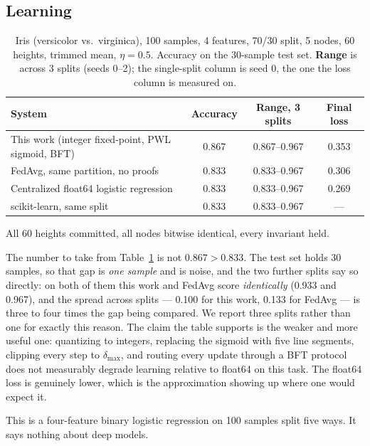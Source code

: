 \documentclass{llncs}
\begin{document}
\subsection{Learning}
\label{sec:eval-learning}

\begin{table}[t]
\centering
\caption{Iris (versicolor vs.\ virginica), 100 samples, 4 features, 70/30 split,
5 nodes, 60 heights, trimmed mean, $\eta = 0.5$. Accuracy on the 30-sample test
set. \textbf{Range} is across 3 splits (seeds 0--2); the single-split column is
seed 0, the one the loss column is measured on.}
\label{tab:learning}
\begin{tabular}{lccc}
\toprule
\textbf{System} & \textbf{Accuracy} & \textbf{Range, 3 splits} &
\textbf{Final loss} \\
\midrule
This work (integer fixed-point, PWL sigmoid, BFT) & 0.867 & 0.867--0.967 & 0.353 \\
FedAvg, same partition, no proofs & 0.833 & 0.833--0.967 & 0.306 \\
Centralized float64 logistic regression & 0.833 & 0.833--0.967 & 0.269 \\
scikit-learn, same split & 0.833 & 0.833--0.967 & --- \\
\bottomrule
\end{tabular}
\end{table}

All 60 heights committed, all nodes bitwise identical, every invariant held.

The number to take from Table~\ref{tab:learning} is not $0.867 > 0.833$. The
test set holds 30 samples, so that gap is \emph{one sample} and is noise, and
the two further splits say so directly: on both of them this work and FedAvg
score \emph{identically} (0.933 and 0.967), and the spread across splits ---
0.100 for this work, 0.133 for FedAvg --- is three to four times the gap being
compared. We report three splits rather than one for exactly this reason. The
claim the table supports is the weaker and more useful one: quantizing to integers,
replacing the sigmoid with five line segments, clipping every step to
$\delta_{\max}$, and routing every update through a BFT protocol does not
measurably degrade learning relative to float64 on this task. The float64 loss
is genuinely lower, which is the approximation showing up where one would expect
it.

This is a four-feature binary logistic regression on 100 samples split five
ways. It says nothing about deep models.
\end{document}
